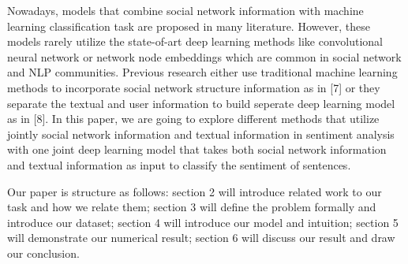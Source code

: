 Nowadays, models that combine social network information with machine learning classification task are proposed in many literature. However, these models rarely utilize the state-of-art deep learning methods like convolutional neural network or network node embeddings which are common in social network and NLP communities. Previous research either use traditional machine learning methods to incorporate social network structure information as in [7] or they separate the textual and user information to build seperate deep learning model as in [8]. In this paper, we are going to explore different methods that utilize jointly social network information and textual information in sentiment analysis with one joint deep learning model that takes both social network information and textual information as input to classify the sentiment of sentences.

Our paper is structure as follows: section 2 will introduce related work to our task and how we relate them; section 3 will define the problem formally and introduce our dataset; section 4 will introduce our model and intuition; section 5 will demonstrate our numerical result; section 6 will discuss our result and draw our conclusion.
